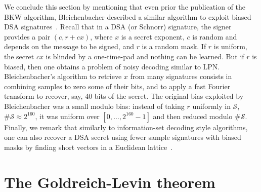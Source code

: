 \documentclass[11pt,a4paper]{article}
\theoremstyle{definition}
\begin{document}
\medskip

We conclude this section by mentioning that even prior the publication of the BKW algorithm, Bleichenbacher described a similar algorithm to exploit biased DSA signatures~\cite{bleichenbacher, ac14bleich}.
Recall that in a DSA (or Schnorr) signature, the signer provides a pair $(c,r+cx)$, where $x$ is a secret exponent, $c$ is random and depends on the message to be signed, and $r$ is
a random mask. If $r$ is uniform, the secret $cx$ is blinded by a one-time-pad and nothing can be learned. But if $r$ is biased, then one obtains a problem of noisy decoding similar
to LPN. Bleichenbacher's algorithm to retrieve $x$ from many signatures consists in combining samples to zero some of their bits, and to apply a fast Fourier transform to recover,
say, 40 bits of the secret. The original bias exploited by Bleichenbacher was a small modulo bias: instead of taking $r$ uniformly in $\mathcal{S}$, $\#\mathcal{S} \approx 2^{160}$,
it was uniform over $[0,\ldots,2^{160}-1]$ and then reduced modulo $\#\mathcal{S}$.
Finally, we remark that similarly to information-set decoding style algorithms, one can also recover a DSA secret using fewer sample signatures with biased masks by finding short vectors in
a Euclidean lattice~\cite{howgrave_grahm_Smart_dsa}.

\section{The Goldreich-Levin theorem}






\end{document}
